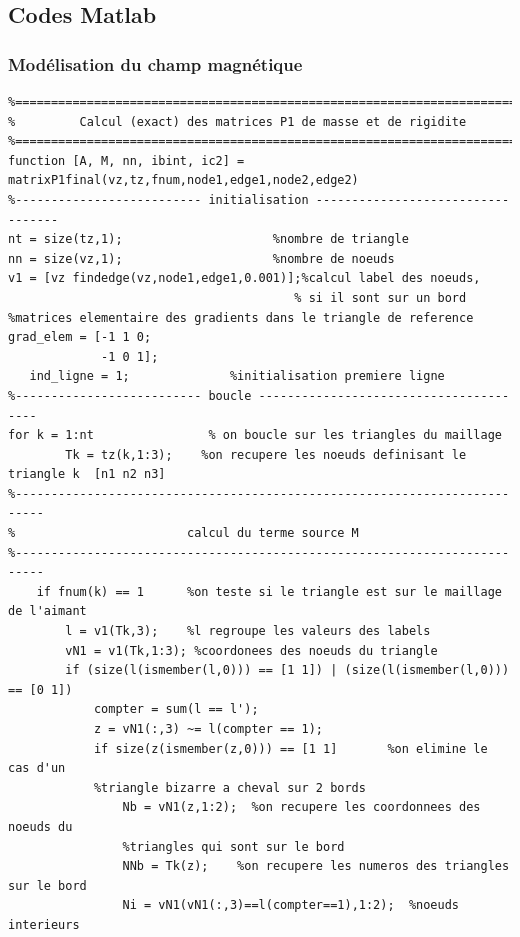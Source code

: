 \documentclass[a4paper,12pt,titlepage]{report}
\begin{document}
\begin{onehalfspace}
\begin{appendix}

\chapter{Codes Matlab}
\label{annexe_2}

\subsection{Modélisation du champ magnétique}
\small

\begin{verbatim}
%==========================================================================
%         Calcul (exact) des matrices P1 de masse et de rigidite
%==========================================================================
function [A, M, nn, ibint, ic2] = matrixP1final(vz,tz,fnum,node1,edge1,node2,edge2)
%-------------------------- initialisation ----------------------------------
nt = size(tz,1);                     %nombre de triangle
nn = size(vz,1);                     %nombre de noeuds
v1 = [vz findedge(vz,node1,edge1,0.001)];%calcul label des noeuds,
										% si il sont sur un bord
%matrices elementaire des gradients dans le triangle de reference
grad_elem = [-1 1 0;
             -1 0 1];
   ind_ligne = 1;              %initialisation premiere ligne
%-------------------------- boucle ---------------------------------------   
for k = 1:nt				% on boucle sur les triangles du maillage
        Tk = tz(k,1:3);    %on recupere les noeuds definisant le triangle k  [n1 n2 n3]
%--------------------------------------------------------------------------   
%                        calcul du terme source M
%--------------------------------------------------------------------------
    if fnum(k) == 1      %on teste si le triangle est sur le maillage de l'aimant                                    
		l = v1(Tk,3);    %l regroupe les valeurs des labels
	    vN1 = v1(Tk,1:3); %coordonees des noeuds du triangle
	    if (size(l(ismember(l,0))) == [1 1]) | (size(l(ismember(l,0))) == [0 1])
    		compter = sum(l == l');
        	z = vN1(:,3) ~= l(compter == 1);
			if size(z(ismember(z,0))) == [1 1]       %on elimine le cas d'un 
			%triangle bizarre a cheval sur 2 bords
        		Nb = vN1(z,1:2);  %on recupere les coordonnees des noeuds du 
        		%triangles qui sont sur le bord 
            	NNb = Tk(z);    %on recupere les numeros des triangles sur le bord
           		Ni = vN1(vN1(:,3)==l(compter==1),1:2);  %noeuds interieurs

\end{verbatim}
\end{appendix}
\end{onehalfspace}
\end{document}
